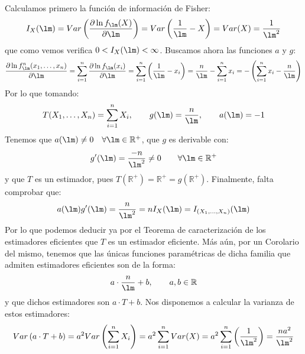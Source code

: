 \begin{ejercicio}
\begin{enumerate}[label=\alph*)]
            Calculamos primero la función de información de Fisher:
            \begin{equation*}
                I_X(\lm) = Var\left(\dfrac{\partial \ln f_\lm(X)}{\partial \lm}\right) = Var\left(\frac{1}{\lm}-X\right) = Var(X) = \frac{1}{\lm^2}
            \end{equation*}
            que como vemos verifica $0<I_X(\lm) <\infty$. Buscamos ahora las funciones $a$ y $g$:
            \begin{equation*}
                \dfrac{\partial \ln f_\lm^n(x_1, \ldots, x_n)}{\partial \lm} = \sum_{i=1}^{n}\dfrac{\partial \ln f_\lm(x_i)}{\partial \lm} = \sum_{i=1}^{n} \left(\frac{1}{\lm}-x_i\right) = \frac{n}{\lm} - \sum_{i=1}^{n}x_i = -\left(\sum_{i=1}^{n}x_i - \frac{n}{\lm}\right)
            \end{equation*}
            Por lo que tomando:
            \begin{equation*}
                T(X_1, \ldots, X_n) = \sum_{i=1}^{n} X_i, \qquad g(\lm) = \frac{n}{\lm}, \qquad a(\lm) = -1
            \end{equation*}
            Tenemos que $a(\lm) \neq 0 \quad \forall \lm\in \mathbb{R}^+$, que $g$ es derivable con:
            \begin{equation*}
                g'(\lm) = \frac{-n}{\lm^2} \neq 0 \qquad \forall \lm\in \mathbb{R}^+
            \end{equation*}
            y que $T$ es un estimador, pues $T(\mathbb{R}^+) = \mathbb{R}^+ = g(\mathbb{R}^+)$. Finalmente, falta comprobar que:
            \begin{equation*}
                a(\lm)g'(\lm) = \frac{n}{\lm^2} = nI_X(\lm) = I_{(X_1, \ldots, X_n)}(\lm)
            \end{equation*}
            Por lo que podemos deducir ya por el Teorema de caracterización de los estimadores eficientes que $T$ es un estimador eficiente. Más aún, por un Corolario del mismo, tenemos que las únicas funciones paramétricas de dicha familia que admiten estimadores eficientes son de la forma:
            \begin{equation*}
                a\cdot \frac{n}{\lm}+b, \qquad a,b\in \mathbb{R}
            \end{equation*}
            y que dichos estimadores son $a\cdot T+b$. Nos disponemos a calcular la varianza de estos estimadores:
            \begin{equation*}
                Var\left(a\cdot T+b\right) = a^2 Var\left(\sum_{i=1}^{n}X_i\right) = a^2\sum_{i=1}^{n}Var(X) = a^2 \sum_{i=1}^{n} \left(\frac{1}{\lm^2}\right) = \frac{na^2}{\lm^2}

\end{equation*}
\end{enumerate}
\end{ejercicio}

